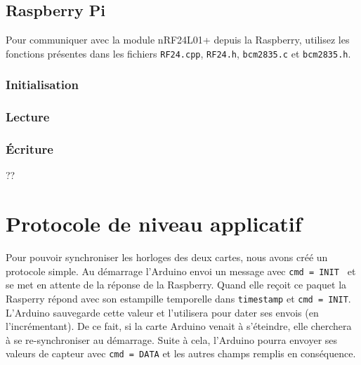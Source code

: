 \documentclass[a4paper, titlepage, oneside, 12pt]{article}%
\begin{document}
\subsection{Raspberry Pi}
Pour communiquer avec la module nRF24L01+ depuis la Raspberry, utilisez les fonctions présentes dans les fichiers \texttt{RF24.cpp}, \texttt{RF24.h}, \texttt{bcm2835.c} et \texttt{bcm2835.h}.

\subsubsection{Initialisation}
\subsubsection{Lecture}
\subsubsection{Écriture}
??

\section{Protocole de niveau applicatif}
Pour pouvoir synchroniser les horloges des deux cartes, nous avons créé un protocole simple.
Au démarrage l'Arduino envoi un message avec \texttt{cmd = INIT } et se met en attente de la réponse de la Raspberry. Quand elle reçoit ce paquet la Rasperry répond avec son estampille temporelle dans \texttt{timestamp} et \texttt{cmd = INIT}. L'Arduino sauvegarde cette valeur et l'utilisera pour dater ses envois (en l'incrémentant).
De ce fait, si la carte Arduino venait à s'éteindre, elle cherchera à se re-synchroniser au démarrage.
Suite à cela, l'Arduino pourra envoyer ses valeurs de capteur avec \texttt{cmd = DATA} et les autres champs remplis en conséquence.
\end{document}
